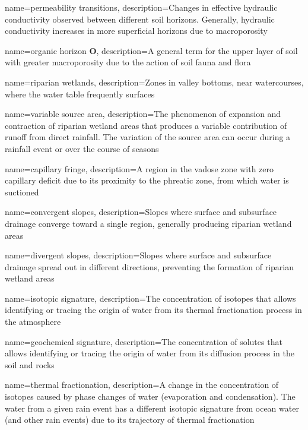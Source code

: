 {
    name=permeability transitions,
    description={Changes in effective hydraulic conductivity observed between different soil horizons. Generally, hydraulic conductivity increases in more superficial horizons due to macroporosity}
}

{
    name=organic horizon $\textbf{O}$,
    description={A general term for the upper layer of soil with greater macroporosity due to the action of soil fauna and flora}
}

{
    name=riparian wetlands,
    description={Zones in valley bottoms, near watercourses, where the water table frequently surfaces}
}

{
    name=variable source area,
    description={The phenomenon of expansion and contraction of riparian wetland areas that produces a variable contribution of runoff from direct rainfall. The variation of the source area can occur during a rainfall event or over the course of seasons}
}

{
    name=capillary fringe,
    description={A region in the vadose zone with zero capillary deficit due to its proximity to the phreatic zone, from which water is suctioned}
}

{
    name=convergent slopes,
    description={Slopes where surface and subsurface drainage converge toward a single region, generally producing riparian wetland areas}
}

{
    name=divergent slopes,
    description={Slopes where surface and subsurface drainage spread out in different directions, preventing the formation of riparian wetland areas}
}

{
    name=isotopic signature,
    description={The concentration of isotopes that allows identifying or tracing the origin of water from its thermal fractionation process in the atmosphere}
}

{
    name=geochemical signature,
    description={The concentration of solutes that allows identifying or tracing the origin of water from its diffusion process in the soil and rocks}
}

{
    name=thermal fractionation,
    description={A change in the concentration of isotopes caused by phase changes of water (evaporation and condensation). The water from a given rain event has a different isotopic signature from ocean water (and other rain events) due to its trajectory of thermal fractionation}
}

